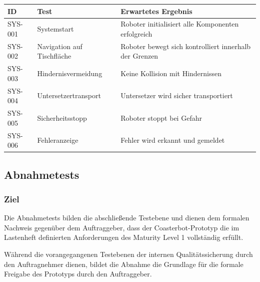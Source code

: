 \begin{longtable}[]{@{}
  >{\raggedright\arraybackslash}p{}
  >{\raggedright\arraybackslash}p{}
  >{\raggedright\arraybackslash}p{}@{}}
\toprule\noalign{}
\begin{minipage}[b]{\linewidth}\raggedright
ID
\end{minipage} & \begin{minipage}[b]{\linewidth}\raggedright
Test
\end{minipage} & \begin{minipage}[b]{\linewidth}\raggedright
Erwartetes Ergebnis
\end{minipage} \\
\midrule\noalign{}
\endhead
\bottomrule\noalign{}
\endlastfoot
SYS-001 & Systemstart & Roboter initialisiert alle Komponenten
erfolgreich \\
SYS-002 & Navigation auf Tischfläche & Roboter bewegt sich kontrolliert
innerhalb der Grenzen \\
SYS-003 & Hindernisvermeidung & Keine Kollision mit Hindernissen \\
SYS-004 & Untersetzertransport & Untersetzer wird sicher
transportiert \\
SYS-005 & Sicherheitsstopp & Roboter stoppt bei Gefahr \\
SYS-006 & Fehleranzeige & Fehler wird erkannt und gemeldet \\
\end{longtable}

\subsection{Abnahmetests}\label{abnahmetests}

\subsubsection{Ziel}\label{ziel-4}

Die Abnahmetests bilden die abschließende Testebene und dienen dem
formalen Nachweis gegenüber dem Auftraggeber, dass der
Coasterbot-Prototyp die im Lastenheft definierten Anforderungen des
Maturity Level 1 vollständig erfüllt.

Während die vorangegangenen Testebenen der internen Qualitätssicherung
durch den Auftragnehmer dienen, bildet die Abnahme die Grundlage für die
formale Freigabe des Prototyps durch den Auftraggeber.

